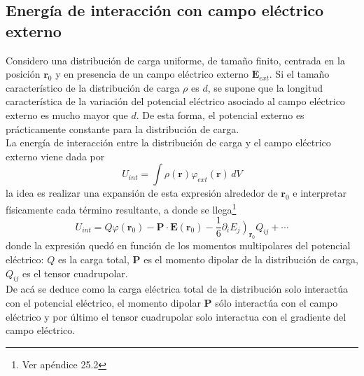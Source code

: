 \subsection{Energía de interacción con campo eléctrico externo}
Considero una distribución de carga uniforme, de tamaño finito, centrada en la posición $\textbf{r}_{0}$ y en presencia de un campo eléctrico externo $\textbf{E}_{ext}$. Si el tamaño característico de la distribución de carga $\rho$ es $d$, se supone que la longitud característica de la variación del potencial eléctrico asociado al campo eléctrico externo es mucho mayor que $d$. De esta forma, el potencial externo es prácticamente constante para la distribución de carga.\\
\indent La energía de interacción entre la distribución de carga y el campo eléctrico externo viene dada por
\begin{equation*}
    U_{int} = \int \rho(\textbf{r})\varphi_{ext}(\textbf{r})\,dV
\end{equation*}
la idea es realizar una expansión de esta expresión alrededor de $\textbf{r}_{0}$ e interpretar físicamente cada término resultante, a donde se llega\footnote{Ver apéndice 25.2}
\begin{equation*}
    U_{int} = 
    Q\varphi(\textbf{r}_{0}) - \textbf{P}\cdot \textbf{E}(\textbf{r}_{0}) - 
    \frac{1}{6}
    \left.
        \partial_{i} E_{j}
    \right)_{\textbf{r}_{0}}Q_{ij} + \cdots
\end{equation*}
donde la expresión quedó en función de los momentos multipolares del potencial eléctrico: $Q$ es la carga total, $\textbf{P}$ es el momento dipolar de la distribución de carga, $Q_{ij}$ es el tensor cuadrupolar.\\
\indent De acá se deduce como la carga eléctrica total de la distribución solo interactúa con el potencial eléctrico, el momento dipolar $\textbf{P}$ sólo interactúa con el campo eléctrico y por último el tensor cuadrupolar solo interactua con el gradiente del campo eléctrico.





